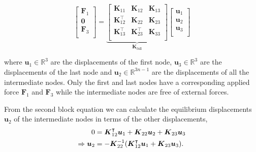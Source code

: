 \begin{equation}
\begin{bmatrix}
\boldsymbol{F}_{1} \\
\boldsymbol{0} \\
\boldsymbol{F}_{3} \\
\end{bmatrix}
=
\underbrace{
\begin{bmatrix}
          \boldsymbol{K}_{11} &           \boldsymbol{K}_{12} & \boldsymbol{K}_{13} \\
\boldsymbol{K}_{12}^\intercal &           \boldsymbol{K}_{22} & \boldsymbol{K}_{23} \\
\boldsymbol{K}_{13}^\intercal & \boldsymbol{K}_{23}^\intercal & \boldsymbol{K}_{33} \\
\end{bmatrix}
}_{\boldsymbol{K}_{\mathrm{full}}}
\begin{bmatrix}
\boldsymbol{u}_{1} \\
\boldsymbol{u}_{2} \\
\boldsymbol{u}_{3} \\
\end{bmatrix}
\end{equation}

where $\boldsymbol{u}_1 \in \mathbb{R}^3$ are the displacements of the first node, $\boldsymbol{u}_3 \in \mathbb{R}^3$ are the displacements of the last node and $\boldsymbol{u}_2 \in \mathbb{R}^{3n-1}$ are the displacements of all the intermediate nodes.
Only the first and last nodes have a corresponding applied force $\boldsymbol{F}_{1}$ and $\boldsymbol{F}_{3}$ while the intermediate nodes are free of external forces.

From the second block equation we can calculate the equilibrium displacements $\boldsymbol{u}_{2}$ of the intermediate nodes in terms of the other displacements,
%
\begin{align}
0 &= \boldsymbol{K}_{12}^\intercal \boldsymbol{u}_1 + \boldsymbol{K}_{22}\boldsymbol{u}_2 + \boldsymbol{K}_{23}\boldsymbol{u}_3 \notag \\
\Rightarrow \boldsymbol{u}_2 &= -\boldsymbol{K}_{22}^{-1}(\boldsymbol{K}_{12}^\intercal \boldsymbol{u}_1 + \boldsymbol{K}_{23}\boldsymbol{u}_3).
\end{align}

